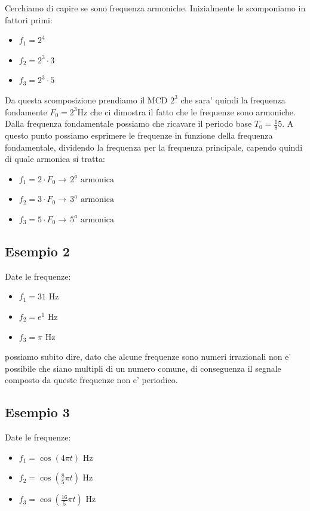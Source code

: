 Cerchiamo di capire se sono frequenza armoniche.
Inizialmente le scomponiamo in fattori primi:
\begin{itemize}
    \item $f_1 = 2^4$
    \item $f_2 = 2^3 \cdot 3$
    \item $f_3 = 2^3 \cdot 5$
\end{itemize}

Da questa scomposizione prendiamo il MCD $2^3$ che sara' quindi la frequenza fondamente $F_0 = 2^3 \mbox{Hz}$ che ci dimostra il fatto che le frequenze sono armoniche.
Dalla frequenza fondamentale possiamo che ricavare il periodo base $T_0 = \frac{1}{8} 5$.
A questo punto possiamo esprimere le frequenze in funzione della frequenza fondamentale, dividendo la frequenza per la frequenza principale, capendo quindi di quale armonica si tratta:

\begin{itemize}
    \item $f_1 = 2 \cdot F_0 \rightarrow \, 2^a\mbox{ armonica}$
    \item $f_2 = 3 \cdot F_0 \rightarrow \, 3^a\mbox{ armonica}$
    \item $f_3 = 5 \cdot F_0 \rightarrow \, 5^a\mbox{ armonica}$
\end{itemize}

\subsection{Esempio 2}
Date le frequenze:
\begin{itemize}
    \item $f_1 = 31$ Hz
    \item $f_2 = e^1$ Hz
    \item $f_3 = \pi$ Hz
\end{itemize}

possiamo subito dire, dato che alcune frequenze sono numeri irrazionali non e' possibile che siano multipli di un numero comune, di conseguenza il segnale composto da queste frequenze non e' periodico.

\subsection{Esempio 3}
Date le frequenze:
\begin{itemize}
    \item $f_1 = \cos{(4 \pi t)}$ Hz
    \item $f_2 = \cos{(\frac{8}{5} \pi t)}$ Hz
    \item $f_3 = \cos{(\frac{16}{5} \pi t)}$ Hz
\end{itemize}

